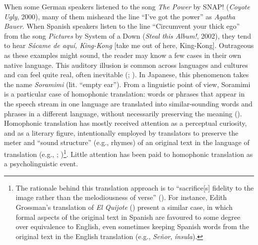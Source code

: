 \documentclass[
]{article}
\begin{document}
When some German speakers listened to the song \emph{The Power} by SNAP!
(\emph{Coyote Ugly}, 2000), many of them misheard the line ``I've got
the power'' as \emph{Agatha Bauer}. When Spanish speakers listen to the
line ``Circumvent your thick ego'' from the song \emph{Pictures} by
System of a Down (\emph{Steal this Album!}, 2002), they tend to hear
\emph{Sácame de aquí, King-Kong} {[}take me out of here, King-Kong{]}.
Outrageous as these examples might sound, the reader may know a few
cases in their own native language. This auditory illusion is common
across languages and cultures and can feel quite real, often inevitable
(;
). In
Japanese, this phenomenon takes the name \emph{Soramimi} (lit. ``empty
ear''). From a linguistic point of view, Soramimi is a particular case
of homophonic translation: words or phrases that appear in the speech
stream in one language are translated into similar-sounding words and
phrases in a different language, without necessarily preserving the
meaning (). Homophonic
translation has mostly received attention as a perceptual curiosity, and
as a literary figure, intentionally employed by translators to preserve
the meter and ``sound structure'' (e.g., rhymes) of an original text in
the language of translation (e.g.,
;
)\footnote{The
  rationale behind this translation approach is to ``sacrifice{[}s{]}
  fidelity to the image rather than the melodiousness of verse''
  (). For instance, Edith
  Grossman's translation of \emph{El Quijote}
  () present a
  similar case, in which formal aspects of the original text in Spanish
  are favoured to some degree over equivalence to English, even
  sometimes keeping Spanish words from the original text in the English
  translation (e.g., \emph{Señor}, \emph{ínsula}).}. Little attention
has been paid to homophonic translation as a psycholinguistic event.
\end{document}
